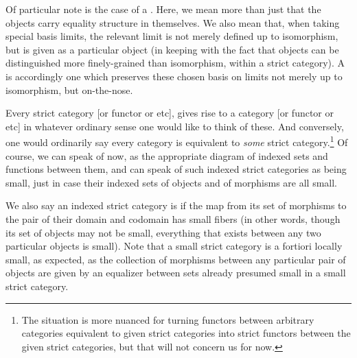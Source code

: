 Of particular note is the case of a . Here, we mean more than just that the objects carry equality structure in themselves. We also mean that, when taking special basis limits, the relevant limit is not merely defined up to isomorphism, but is given as a particular object (in keeping with the fact that objects can be distinguished more finely-grained than isomorphism, within a strict category). A  is accordingly one which preserves these chosen basis on limits not merely up to isomorphism, but on-the-nose. 

Every strict category [or functor or etc], gives rise to a category [or functor or etc] in whatever ordinary sense one would like to think of these. And conversely, one would ordinarily say every category is equivalent to \emph{some} strict category.\footnote{The situation is more nuanced for turning functors between arbitrary categories equivalent to given strict categories into strict functors between the given strict categories, but that will not concern us for now.} Of course, we can speak of  now, as the appropriate diagram of indexed sets and functions between them, and can speak of such indexed strict categories as being small, just in case their indexed sets of objects and of morphisms are all small.

We also say an indexed strict category is  if the map from its set of morphisms to the pair of their domain and codomain has small fibers (in other words, though its set of objects may not be small, everything that exists between any two particular objects is small). Note that a small strict category is a fortiori locally small, as expected, as the collection of morphisms between any particular pair of objects are given by an equalizer between sets already presumed small in a small strict category.

